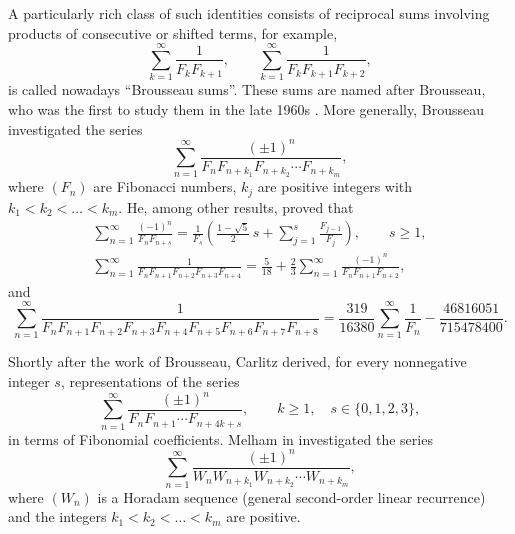 \documentclass[12pt,reqno]{article}
\begin{document}
A particularly rich class of such identities consists of reciprocal sums involving products of consecutive or shifted terms, for example,
	\begin{equation*} 
	\sum_{k=1}^{\infty}\frac{1}{F_k F_{k+1}}, \qquad \sum_{k=1}^{\infty}\frac{1}{F_k F_{k+1} F_{k+2}},
	\end{equation*}
is called nowadays ``Brousseau sums''. These sums are named after Brousseau, who was the first to study them in the 
late 1960s \cite{Brousseau1967,Brousseau1967b}. More generally, Brousseau investigated 
the series
	\begin{equation*}
	\sum_{n=1}^{\infty}\frac{(\pm1)^n}{F_nF_{n+k_1}F_{n+k_2}\cdots F_{n+k_m}},
	\end{equation*}
where $(F_n)$ are Fibonacci numbers, $k_j$ are positive integers with $k_1<k_2<\ldots<k_m$. He, among other results, proved that
	\begin{gather*}
	\sum_{n=1}^{\infty}
	\frac{(-1)^n}{F_{n} F_{n+s}}
	=\frac{1}{F_s}
	\left(\frac{1-\sqrt5}{2}\,s+\sum_{j=1}^{s}\frac{F_{j-1}}{F_j}
	\right),\qquad s\geq1,\\
	\sum_{n=1}^{\infty}
	\frac{1}{F_{n}F_{n+1}F_{n+2}F_{n+3}F_{n+4}}
	=\frac{5}{18}+\frac23
	\sum_{n=1}^{\infty
	}\frac{(-1)^n}{F_{n}F_{n+1}F_{n+2}},
	\end{gather*}
and
	\begin{equation*}
	\sum_{n=1}^{\infty}
	\frac{1}{F_{n} F_{n+1}F_{n+2}F_{n+3}F_{n+4}F_{n+5}F_{n+6}F_{n+7}F_{n+8}}
	=
	\frac{319}{16380}
	\sum_{n=1}^{\infty}\frac{1}{F_n}
	-\frac{46816051}{715478400}.
	\end{equation*}

Shortly after the work of Brousseau, Carlitz \cite{Carlitz-71} derived, for every nonnegative integer $s$, representations of the series
	\begin{equation*}
	\sum_{n=1}^{\infty}
	\frac{(\pm1)^n}{F_nF_{n+1}\cdots F_{n+4k+s}},
	\qquad k\ge1,\quad s\in\{0,1,2,3\},
	\end{equation*}
in terms of Fibonomial coefficients.
Melham in \cite {Melham2002}
investigated the series
	\begin{equation*}
	\sum_{n=1}^{\infty}\frac{(\pm1)^n}{W_nW_{n+k_1}W_{n+k_2}\cdots W_{n+k_m}},
	\end{equation*}
where $(W_n)$ is a Horadam sequence (general second-order linear recurrence) and the integers $k_1<k_2<\ldots<k_m$ are positive.
\end{document}
